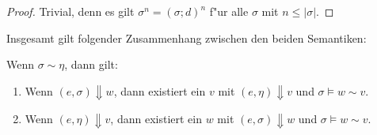 \documentclass[12pt,a4paper,fleqn]{article}
\begin{document}
\begin{proof}
  Trivial, denn es gilt $\sigma^n = (\sigma;d)^n$ f"ur alle $\sigma$ mit $n \le |\sigma|$.
\end{proof}
Insgesamt gilt folgender Zusammenhang zwischen den beiden Semantiken:
\pagebreak[2]
\begin{theorem} \label{theorem1}
  Wenn $\sigma \sim \eta$, dann gilt:
  \begin{enumerate}
  \item Wenn $(e,\sigma) \Downarrow w$, dann existiert ein $v$ mit $(e,\eta) \Downarrow v$ und
    $\sigma \models w \sim v$.
  \item Wenn $(e,\eta) \Downarrow v$, dann existiert ein $w$ mit $(e,\sigma) \Downarrow w$ und
    $\sigma \models w \sim v$.
  \end{enumerate}
\end{theorem}
\end{document}
